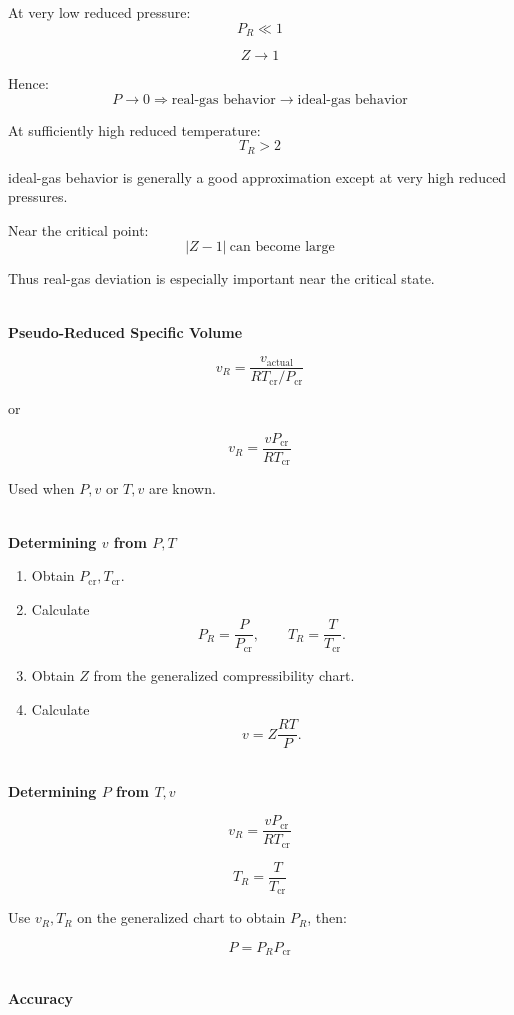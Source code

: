 \documentclass[12pt]{article}
\begin{document}
At very low reduced pressure:
\[
\boxed{P_R\ll1}
\]

\[
\boxed{Z\rightarrow1}
\]

Hence:
\[
\boxed{
P\rightarrow0
\Rightarrow
\text{real-gas behavior}\rightarrow\text{ideal-gas behavior}
}
\]

At sufficiently high reduced temperature:
\[
\boxed{T_R>2}
\]

ideal-gas behavior is generally a good approximation except at very high reduced pressures.

Near the critical point:
\[
\boxed{|Z-1|\ \text{can become large}}
\]

Thus real-gas deviation is especially important near the critical state.

\textbf{\\ Pseudo-Reduced Specific Volume}

\[
\boxed{
v_R=
\frac{v_{\mathrm{actual}}}
{RT_{\mathrm{cr}}/P_{\mathrm{cr}}}
}
\]

or

\[
\boxed{
v_R=
\frac{vP_{\mathrm{cr}}}{RT_{\mathrm{cr}}}
}
\]

Used when $P,v$ or $T,v$ are known.

\textbf{\\ Determining $v$ from $P,T$}

\begin{enumerate}[leftmargin=*]
    \item Obtain $P_{\mathrm{cr}},T_{\mathrm{cr}}$.
    \item Calculate
    \[
    P_R=\frac{P}{P_{\mathrm{cr}}},
    \qquad
    T_R=\frac{T}{T_{\mathrm{cr}}}.
    \]
    \item Obtain $Z$ from the generalized compressibility chart.
    \item Calculate
    \[
    \boxed{v=Z\frac{RT}{P}}.
    \]
\end{enumerate}

\textbf{\\ Determining $P$ from $T,v$}

\[
v_R=\frac{vP_{\mathrm{cr}}}{RT_{\mathrm{cr}}}
\]

\[
T_R=\frac{T}{T_{\mathrm{cr}}}
\]

Use $v_R,T_R$ on the generalized chart to obtain $P_R$, then:

\[
\boxed{
P=P_RP_{\mathrm{cr}}
}
\]

\textbf{\\ Accuracy}
\end{document}

